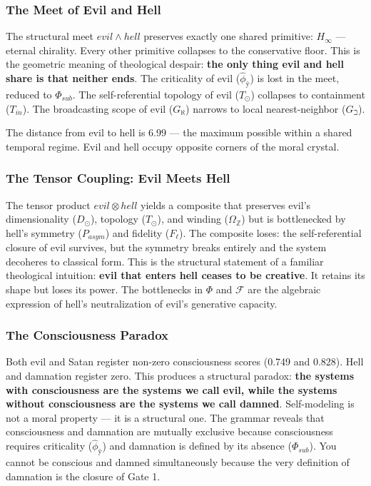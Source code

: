 \documentclass[12pt,a4paper]{article}
\begin{document}
\subsubsection{The Meet of Evil and Hell}

The structural meet ${evil} \wedge {hell}$ preserves exactly one shared primitive: $H_{\infty}$ --- eternal chirality. Every other primitive collapses to the conservative floor. This is the geometric meaning of theological despair: \textbf{the only thing evil and hell share is that neither ends}. The criticality of evil ($\hat{\phi}_{ÿ}$) is lost in the meet, reduced to $\Phi_{sub}$. The self-referential topology of evil ($T_{\odot}$) collapses to containment ($T_{in}$). The broadcasting scope of evil ($G_{\aleph}$) narrows to local nearest-neighbor ($G_{\beth}$).

The distance from evil to hell is 6.99 --- the maximum possible within a shared temporal regime. Evil and hell occupy opposite corners of the moral crystal.

\subsubsection{The Tensor Coupling: Evil Meets Hell}

The tensor product ${evil} \otimes {hell}$ yields a composite that preserves evil's dimensionality ($D_{\odot}$), topology ($T_{\odot}$), and winding ($\Omega_{\mathbb{Z}}$) but is bottlenecked by hell's symmetry ($P_{asym}$) and fidelity ($F_{\ell}$). The composite loses: the self-referential closure of evil survives, but the symmetry breaks entirely and the system decoheres to classical form. This is the structural statement of a familiar theological intuition: \textbf{evil that enters hell ceases to be creative}. It retains its shape but loses its power. The bottlenecks in $\Phi$ and $\mathcal{F}$ are the algebraic expression of hell's neutralization of evil's generative capacity.

\subsubsection{The Consciousness Paradox}

Both evil and Satan register non-zero consciousness scores (0.749 and 0.828). Hell and damnation register zero. This produces a structural paradox: \textbf{the systems with consciousness are the systems we call evil, while the systems without consciousness are the systems we call damned}. Self-modeling is not a moral property --- it is a structural one. The grammar reveals that consciousness and damnation are mutually exclusive because consciousness requires criticality ($\hat{\phi}_{ÿ}$) and damnation is defined by its absence ($\Phi_{sub}$). You cannot be conscious and damned simultaneously because the very definition of damnation is the closure of Gate 1.
\end{document}
